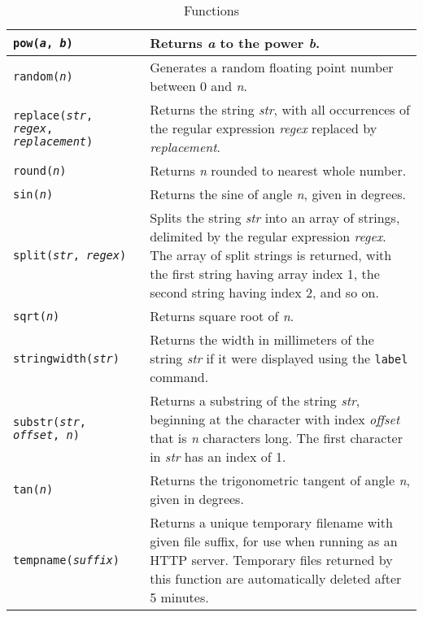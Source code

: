 \begin{table}[htb]
\begin{tabular}{|l|p{7cm}|}
\hline

\texttt{pow(\textit{a}, \textit{b})} &
Returns \textit{a} to the power \textit{b}. \\

\hline

\texttt{random(\textit{n})} &
Generates a random floating point number between 0 and \textit{n}. \\

\hline

\texttt{replace(\textit{str}, \textit{regex}, \textit{replacement})} &
Returns the string \textit{str}, with all occurrences of the regular
expression \textit{regex} replaced by \textit{replacement}. \\

\hline

\texttt{round(\textit{n})} &
Returns \textit{n} rounded to nearest whole number. \\

\hline

\texttt{sin(\textit{n})} &
Returns the sine of angle \textit{n}, given in degrees. \\

\hline

\texttt{split(\textit{str}, \textit{regex})} &
Splits the string \textit{str} into an array of strings, delimited by the
regular expression \textit{regex}.
The array of split strings is returned,
with the first string having array index 1, the
second string having index 2, and so on. \\

\hline

\texttt{sqrt(\textit{n})} &
Returns square root of \textit{n}. \\

\hline

\texttt{stringwidth(\textit{str})} &
Returns the width in millimeters of the string \textit{str}
if it were displayed using the \texttt{label} command.  \\

\hline

\texttt{substr(\textit{str}, \textit{offset}, \textit{n})} &
Returns a substring of the string \textit{str}, beginning at the
character with index \textit{offset} that is \textit{n} characters long.
The first character in \textit{str} has an index of 1. \\

\hline

\texttt{tan(\textit{n})} &
Returns the trigonometric tangent of angle \textit{n}, given in degrees. \\

\hline

\texttt{tempname(\textit{suffix})} &
Returns a unique temporary filename with given file suffix,
for use when running as an HTTP server.
Temporary files returned by this function
are automatically deleted after 5 minutes. \\

\hline
\end{tabular}
\caption{Functions}
\label{functions}
\end{table}


